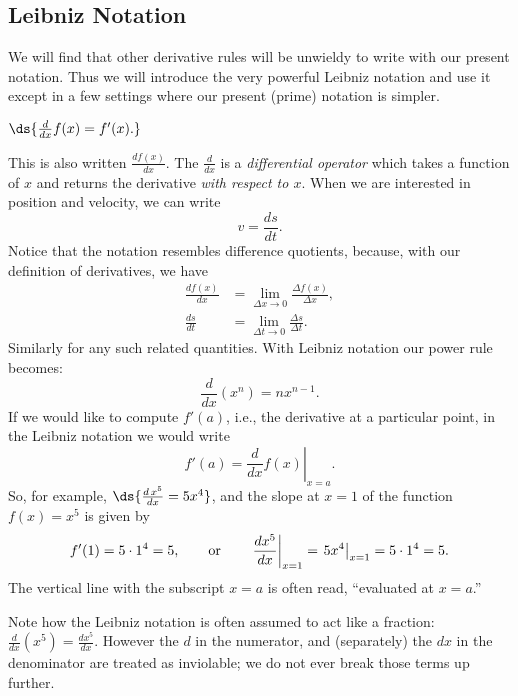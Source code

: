 \subsection{Leibniz Notation}
We will find that other derivative rules will be 
unwieldy to write with our present notation.
Thus we will introduce the very powerful Leibniz notation
and use it except in a few settings where
our present (prime) notation is simpler.
\begin{definition}
$\ds{\frac{d}{dx}f(x)=f'(x).}$
\end{definition}
This is also written $\frac{df(x)}{dx}$.  The 
$\frac{d}{dx}$ is a {\it differential operator} which
takes a function of $x$ and returns the derivative
{\it with respect to $x$}.  When we are interested
in position and velocity, we can write
\begin{equation}
v=\frac{ds}{dt}.\end{equation}
Notice that the notation resembles difference quotients,
because, with our definition of derivatives, we have
\begin{align*}
\frac{df(x)}{dx}&=\lim_{\Delta x\to 0}\frac{\Delta f(x)}{\Delta x},\\
\frac{ds}{dt}&=\lim_{\Delta t\to0}\frac{\Delta s}{\Delta t}.
\end{align*}
Similarly for any such related quantities.
With Leibniz notation  our power rule becomes:
\begin{equation}
\frac{d}{dx}\left(x^n\right)=nx^{n-1}.\label{PowerRule}\end{equation}
If we would like to compute $f'(a)$, i.e., the derivative at
a particular point, in the Leibniz notation we would write
$$f'(a)=\left.\frac{d}{dx}f(x)\right|_{x=a}.$$
So, for example, $\ds{\frac{d\,x^5}{dx}=5x^4}$, and the 
slope at $x=1$ of the function $f(x)=x^5$ is given by\footnotemark
$$f'(1)=5\cdot1^4=5,\qquad\text{or}\qquad
\left.\frac{d x^5}{dx}\right|_{x=1}=\left.\vphantom{X_X^X}
               5x^4\right|_{x=1}=5\cdot1^4=5.$$
The vertical line with the subscript $x=a$
is often read, ``evaluated at $x=a$.''  

Note how the Leibniz notation is often assumed to act like a 
fraction:  ${\frac{d}{dx}\left(x^5\right)=\frac{d x^5}{dx}}$.
However the $d$ in the numerator, and (separately) the $dx$ in the 
denominator are treated as inviolable; we do not ever
break those terms up further.

